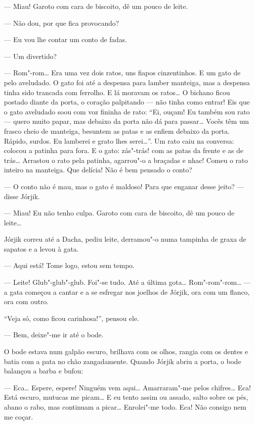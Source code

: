 --- Miau! Garoto com cara de biscoito, dê um pouco de leite.

--- Não dou, por que fica provocando?

--- Eu vou lhe contar um conto de fadas.

--- Um divertido?

--- Rom"-rom\ldots{} Era uma vez dois ratos, uns fiapos cinzentinhos. E um
gato de pelo aveludado. O gato foi até a despensa para lamber manteiga,
mas a despensa tinha sido trancada com ferrolho. E lá moravam os
ratos\ldots{} O bichano ficou postado diante da porta, o coração palpitando
--- não tinha como entrar! Eis que o gato aveludado soou com voz fininha
de rato: ``Ei, ouçam! Eu também sou rato --- quero muito papar, mas
debaixo da porta não dá para passar\ldots{} Vocês têm um frasco cheio de
manteiga, besuntem as patas e as enfiem debaixo da porta. Rápido,
surdos. Eu lamberei e grato lhes serei\ldots{}''. Um rato caiu na conversa:
colocou a patinha para fora. E o gato: zás"-trás! com as patas da frente
e as de trás\ldots{} Arrastou o rato pela patinha, agarrou"-o a braçadas e
nhac! Comeu o rato inteiro na manteiga. Que delícia! Não é bem pensado o
conto?

--- O conto não é mau, mas o gato é maldoso! Para que enganar desse
jeito? --- disse Jórjik.

--- Miau! Eu não tenho culpa. Garoto com cara de biscoito, dê um pouco
de leite\ldots{}

Jórjik correu até a Dacha, pediu leite, derramou"-o numa tampinha de
graxa de sapatos e a levou à gata.

--- Aqui está! Tome logo, estou sem tempo.

--- Leite! Glub"-glub"-glub. Foi"-se tudo. Até a última gota\ldots{}
Rom"-rom"-rom\ldots{} --- a gata começou a cantar e a se esfregar nos joelhos
de Jórjik, ora com um flanco, ora com outro.

``Veja só, como ficou carinhosa!'', pensou ele.

--- Bem, deixe"-me ir até o bode.

O bode estava num galpão escuro, brilhava com os olhos, rangia com os
dentes e batia com a pata no chão zangadamente. Quando Jórjik abriu a
porta, o bode balançou a barba e bufou:

--- Eca\ldots{} Espere, espere! Ninguém vem aqui\ldots{} Amarraram"-me pelos
chifres\ldots{} Eca! Está escuro, mutucas me picam\ldots{} E eu tento assim ou
assado, salto sobre os pés, abano o rabo, mas continuam a picar\ldots{}
Enrolei"-me todo. Eca! Não consigo nem me coçar.

